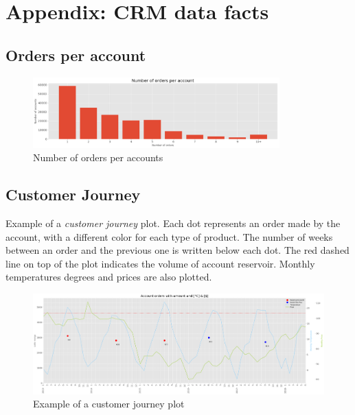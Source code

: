 \appendix

\chapter{Appendix: CRM data facts}

\vspace*{-1cm}

\section{Orders per account}
\begin{figure}[htbp]
    \centering
    \includegraphics[width=9.5cm]{images/number_of_orders_per_account.png}
    \caption{Number of orders per accounts}
    \label{fig-annex:orders_per_accounts}
\end{figure}

\section{Customer Journey}

Example of a \textit{customer journey} plot. Each dot represents an order made by the account, with a different color for each type of product. The number of weeks between an order and the previous one is written below each dot. The red dashed line on top of the plot indicates the volume of account reservoir. Monthly temperatures degrees and prices are also plotted.

\begin{figure}[htbp]
    \centering
    \includegraphics[width=14.5cm]{images/customer-journey.png}
    \caption{Example of a customer journey plot}
    \label{fig-annex:customer-journey}
\end{figure}


